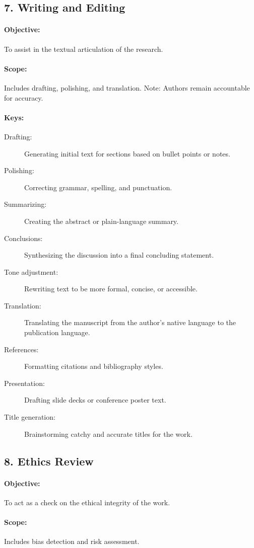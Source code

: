 \documentclass[11pt]{article}
\begin{document}
\subsection*{7. Writing and Editing}
\paragraph{Objective:} To assist in the textual articulation of the research.
\paragraph{Scope:} Includes drafting, polishing, and translation.
Note: Authors remain accountable for accuracy.
\paragraph{Keys:}
\begin{description}
    \item[Drafting:] Generating initial text for sections based on bullet points or notes.
    \item[Polishing:] Correcting grammar, spelling, and punctuation.
    \item[Summarizing:] Creating the abstract or plain-language summary.
    \item[Conclusions:] Synthesizing the discussion into a final concluding statement.
    \item[Tone adjustment:] Rewriting text to be more formal, concise, or accessible.
    \item[Translation:] Translating the manuscript from the author's native language to the publication language.
    \item[References:] Formatting citations and bibliography styles.
    \item[Presentation:] Drafting slide decks or conference poster text.
    \item[Title generation:] Brainstorming catchy and accurate titles for the work.
\end{description}

\subsection*{8. Ethics Review}
\paragraph{Objective:} To act as a check on the ethical integrity of the work.
\paragraph{Scope:} Includes bias detection and risk assessment.
\end{document}
